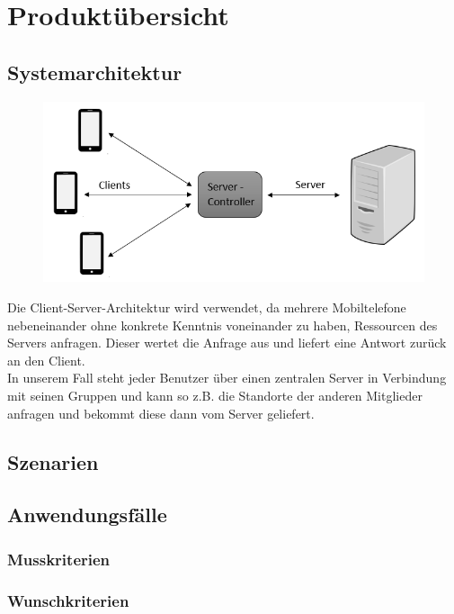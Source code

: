 \section{Produktübersicht}
\subsection{Systemarchitektur}

\begin{figure} [h]	
	\centering
	\includegraphics[scale = 0.8]{res/clientServerArchitektur.png}
\end{figure}
Die Client-Server-Architektur wird verwendet, da mehrere Mobiltelefone nebeneinander ohne konkrete Kenntnis voneinander zu haben, Ressourcen des Servers anfragen. Dieser wertet die Anfrage aus und liefert eine Antwort zurück an den Client. \\
In unserem Fall steht jeder Benutzer über einen zentralen Server in Verbindung mit seinen Gruppen und kann so z.B. die Standorte der anderen Mitglieder anfragen und bekommt diese dann vom Server geliefert.

\subsection{Szenarien}
\subsection{Anwendungsfälle}
\subsubsection{Musskriterien}
\subsubsection{Wunschkriterien}